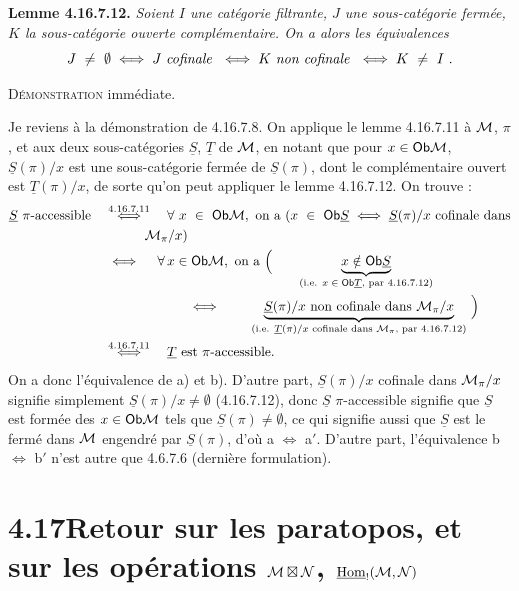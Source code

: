 \noindent\textbf{Lemme 4.16.7.12.} \textit{Soient $I$ une catégorie filtrante, $J$ une sous-catégorie fermée, $K$ la sous-catégorie ouverte complémentaire. On a alors les équivalences}
\[
J \ \neq \ \emptyset \iff J \text{ \textit{cofinale} } \iff K \text{ \textit{non cofinale} } \iff K \ \neq \ I \ .
\]

\noindent\textsc{Démonstration} immédiate.

\noindent Je reviens à la démonstration de 4.16.7.8. On applique le lemme 4.16.7.11 à $\mathcal{M}$, $\pi$, et aux deux
sous-catégories $\underline{S}$, $\underline{T}$ de $\mathcal{M}$, en notant que pour $x\in\mathsf{Ob}\mathcal{M}$, $\underline{S}(\pi)/x$ est une sous-catégorie fermée de $\underline{S}(\pi)$, dont le complémentaire ouvert est $\underline{T}(\pi)/x$, de sorte qu'on peut appliquer le lemme 4.16.7.12. On trouve :
\[
\begin{aligned}
\underline{S}\ \pi\text{-accessible} \quad &\overset{4.16.7.11}{\iff} \quad \forall\ x\ \in\ \Ob\cM,\ \text{on a } (x\ \in\ \Ob\underline{S}\iff\underline{S}(\pi)/x \text{ cofinale dans}\\
&\qquad\quad \cM_\pi/x)\\
&\iff \quad \forall\, x\in\Ob\cM,\ \text{on a } \Bigl( \qquad \underbrace{x\notin\Ob\underline{S}}_{\text{(i.e. $x\in\Ob\underline{T}$, par 4.16.7.12)}}\\
&\qquad\qquad\qquad \iff \qquad \underbrace{\underline{S}(\pi)/x \text{ non cofinale dans } \cM_\pi/x}_{\text{(i.e. $\underline{T}(\pi)/x$ cofinale dans $\cM_\pi$, par 4.16.7.12)}} \ \Bigr)\\
&\overset{4.16.7.11}{\iff} \quad \underline{T} \text{ est } \pi\text{-accessible.}
\end{aligned}
\]
On a donc l'équivalence de a) et b). D'autre part, $\underline{S}(\pi)/x$ cofinale dans $\mathcal{M}_\pi/x$ signifie simplement $\underline{S}(\pi)/x\neq\emptyset$ (4.16.7.12), donc $\underline{S}$ $\pi$-accessible signifie que $\underline{S}$ est formée des $x\in\mathsf{Ob}\mathcal{M}$ tels que $\underline{S}(\pi)\neq\emptyset$, ce qui signifie aussi que $\underline{S}$ est le fermé dans $\mathcal{M}$ engendré par $\underline{S}(\pi)$, d'où a $\iff$ a$'$. D'autre part, l'équivalence b $\iff$ b$'$ n'est autre que 4.6.7.6 (dernière formulation). %


\section*{4.17\quad Retour sur les paratopos, et sur les opérations $\mathcal{M}\boxtimes\mathcal{N}$, $\underline{\operatorname{Hom}}_{!}(\mathcal{M},\mathcal{N})$}

